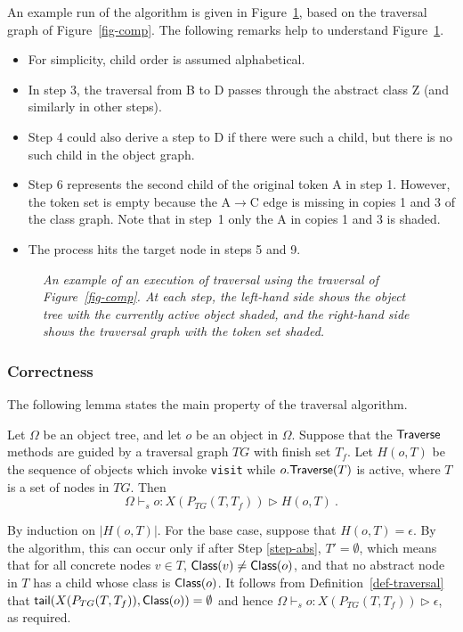 An example run of the algorithm is given in Figure~\ref{fig-run},
based on the traversal graph of Figure~\ref{fig-comp}. The following
remarks help to understand Figure~\ref{fig-run}.
\begin{itemize}
\item For simplicity, child order is assumed alphabetical.
\item In step 3, the traversal from {\sf B} to {\sf D} passes through
      the abstract class {\sf Z} (and similarly in other steps).
\item Step 4 could also derive a step to {\sf D} if there were such a
      child, but there is no such child in the object graph.
\item Step 6 represents the second child of the original token {\sf A}
      in step 1.  However, the token set is empty because the {\sf
      A}$\to${\sf C} edge is missing in copies 1 and 3 of the class
      graph.  Note that in step~1 only the {\sf A} in copies 1 and 3
      is shaded.
\item The process hits the target node in steps 5 and 9.
\end{itemize}

\begin{figure}
\centerline{}
\caption{\em
An example of an execution of traversal using the traversal of
Figure~\protect\ref{fig-comp}. At each step, the left-hand side shows
the object tree with the currently active object shaded, and the
right-hand side shows the traversal graph with the token set shaded.}
\label{fig-run}
\end{figure}

\subsubsection*{Correctness}

The following lemma states the main property of the traversal algorithm.
\begin{lemma}
\label{lem-main}
Let $\Omega$ be an object tree, and let $o$ be an object in $\Omega$.
Suppose that the $\mbox{\sf Traverse}$ methods are guided by a traversal graph
$TG$ with finish set $T_f$. Let $H(o,T)$ be the sequence of objects
which invoke {\tt visit} while $o.\mbox{\sf Traverse}(T)$ is active, where $T$
is a set of nodes in $TG$. Then
$$
\Omega\vdash_s o:X(P_{TG}(T,T_f))\rhd H(o,T)~.
$$
\end{lemma}
\Proof
By induction on $|H(o,T)|$.  For the base case, suppose that
$H(o,T)=\epsilon$. By the algorithm, this can occur only if after Step
\ref{step-abs}, $T'=\emptyset$, which means that for all concrete
nodes $v\in T$, $\mbox{\sf Class}(v)\ne\mbox{\sf Class}(o)$, and that no abstract node in
$T$ has a child whose class is $\mbox{\sf Class}(o)$.  It follows from
Definition~\ref{def-traversal} that
$\mbox{\sf tail}(X(P_{TG}(T,T_f)),\mbox{\sf Class}(o))=\emptyset$ and hence
$\Omega\vdash_s o:X(P_{TG}(T,T_f))\rhd \epsilon$, as required.

